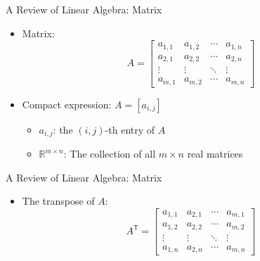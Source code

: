 \documentclass[aspectratio=169,hyperref,UTF8,CJK]{beamer}
\newcommand{\R}{\mathbb{R}}
\newcommand{\trans}{\mathsf{T}}
\begin{document}
\begin{frame}{A Review of Linear Algebra: Matrix}
  \begin{itemize}
    \item Matrix:
      \begin{equation*}
        A=\begin{bmatrix}
          a_{1,1}&a_{1,2}&\cdots&a_{1,n}\\
          a_{2,1}&a_{2,2}&\cdots&a_{2,n}\\
          \vdots&\vdots&\ddots&\vdots\\
          a_{m,1}&a_{m,2}&\cdots&a_{m,n}
        \end{bmatrix}
      \end{equation*}
    \item Compact expression: $A=[a_{i,j}]$
      \begin{itemize}
        \item $a_{i,j}$: the $(i,j)$-th entry of $A$
        \item $\R^{m\times n}$: The collection of all $m\times n$ real matrices
      \end{itemize}
  \end{itemize}
\end{frame}

\begin{frame}{A Review of Linear Algebra: Matrix}
  \begin{itemize}
    \item The transpose of $A$:
      \begin{equation*}
        A^{\trans}=\begin{bmatrix}
          a_{1,1}&a_{2,1}&\cdots&a_{m,1}\\
          a_{1,2}&a_{2,2}&\cdots&a_{m,2}\\
          \vdots&\vdots&\ddots&\vdots\\
          a_{1,n}&a_{2,n}&\cdots&a_{m,n}
        \end{bmatrix}
      \end{equation*}
  \end{itemize}
\end{frame}
\end{document}
